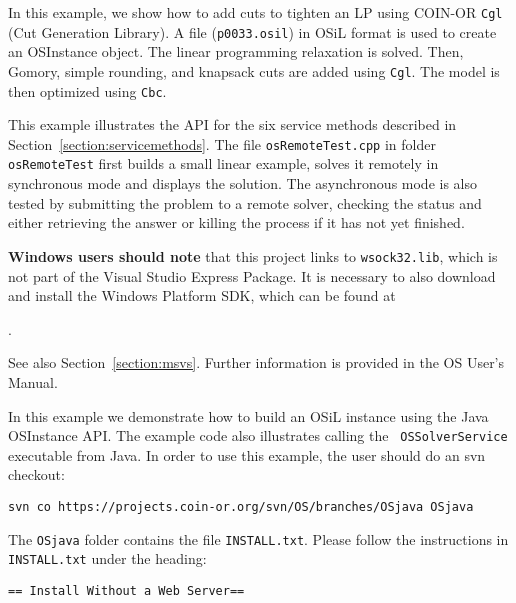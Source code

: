 \label{section:exampleOSAddCuts}

In this example, we show how to add cuts to tighten an LP using COIN-OR
{\tt Cgl} (Cut Generation Library).
A file ({\tt p0033.osil}) in OSiL format is used to create an OSInstance object. The linear programming relaxation
is solved. Then, Gomory, simple rounding, and knapsack cuts are added using {\tt Cgl}.  The model is then optimized
using {\tt Cbc}.

\label{section:exampleOSRemoteTest}

This example illustrates the API for the six service methods described in Section~\ref{section:servicemethods}.
The file {\tt osRemoteTest.cpp} in folder {\tt osRemoteTest} first builds a small linear
example, solves it remotely in synchronous mode and displays the solution.
The asynchronous mode is also tested by submitting the problem to a remote solver,
checking the status and either retrieving the answer or killing the process if it has not
yet finished.

{\bf Windows users should note}
that this project links to {\tt wsock32.lib}, which is not part of the Visual Studio  Express Package.  It is necessary
to also download and install the Windows Platform SDK, which can be found at

\medskip
\noindent{\scriptsize\tt\UrlSdk}. 
\medskip

\ifdevelop
\noindent See also Section~\ref{section:msvs}.
\else
\noindent Further information is provided in the OS User's Manual.
\fi

\label{section:exampleOSJavaDemo}

In this example we demonstrate how to build an OSiL instance using the Java
OSInstance API.  The example code also  illustrates calling the {\tt
OSSolverService} executable from Java. In order to use this example, the user should do an svn
checkout:

\begin{verbatim}
svn co https://projects.coin-or.org/svn/OS/branches/OSjava OSjava
\end{verbatim}

The {\tt OSjava} folder contains the file {\tt INSTALL.txt}. Please follow the
instructions in {\tt  INSTALL.txt} under the heading:
\begin{verbatim}
== Install Without a Web Server==
\end{verbatim}

